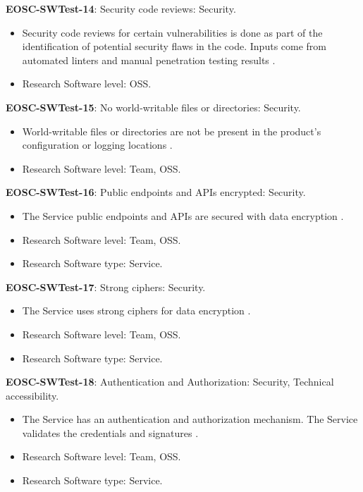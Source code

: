 \textbf{EOSC-SWTest-14}: Security code reviews: Security.

\begin{itemize}
    \item Security code reviews for certain vulnerabilities is done as part of the identification of potential security flaws in the code. Inputs  come from automated linters and manual penetration testing results \cite{gillies_modelling_1992,shepherdson_cessda_2019,orviz_set_2017}.
    \item Research Software level: OSS.
\end{itemize}

\textbf{EOSC-SWTest-15}: No world-writable files or directories: Security.

\begin{itemize}
    \item World-writable files or directories are not be present in the product's configuration or logging locations \cite{orviz_set_2017}.
    \item Research Software level: Team, OSS.
\end{itemize}

\textbf{EOSC-SWTest-16}: Public endpoints and APIs encrypted: Security.

\begin{itemize}
    \item The Service public endpoints and APIs are secured with data encryption \cite{orviz_fernandez_eosc-synergy_2020}.
    \item Research Software level: Team, OSS.
    \item Research Software type: Service.
\end{itemize}

\textbf{EOSC-SWTest-17}: Strong ciphers: Security.

\begin{itemize}
    \item The Service uses strong ciphers for data encryption \cite{orviz_fernandez_eosc-synergy_2020}.
    \item Research Software level: Team, OSS.
    \item Research Software type: Service.
\end{itemize}

\textbf{EOSC-SWTest-18}: Authentication and Authorization: Security, Technical accessibility.

\begin{itemize}
    \item The Service has an authentication and authorization mechanism. The Service validates the credentials and signatures \cite{shepherdson_cessda_2019,orviz_fernandez_eosc-synergy_2020}.
    \item Research Software level: Team, OSS.
    \item Research Software type: Service.
\end{itemize}

